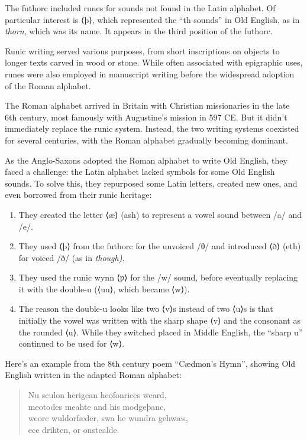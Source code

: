 The futhorc included runes for sounds not found in the Latin alphabet. Of particular interest is ⟨þ⟩, which represented the ``th sounds'' in Old English, as in \textit{thorn}, which was its name. It appears in the third position of the futhorc.

Runic writing served various purposes, from short inscriptions on objects to longer texts carved in wood or stone. While often associated with epigraphic uses, runes were also employed in manuscript writing before the widespread adoption of the Roman alphabet.

The Roman alphabet arrived in Britain with Christian missionaries in the late 6th century, most famously with Augustine's mission in 597 CE. But it didn't immediately replace the runic system. Instead, the two writing systems coexisted for several centuries, with the Roman alphabet gradually becoming dominant.

As the Anglo-Saxons adopted the Roman alphabet to write Old English, they faced a challenge: the Latin alphabet lacked symbols for some Old English sounds. To solve this, they repurposed some Latin letters, created new ones, and even borrowed from their runic heritage:

\begin{enumerate}[noitemsep]
    \item They created the letter ⟨æ⟩ (ash) to represent a vowel sound between /a/ and /e/.

    \item They used ⟨þ⟩ from the futhorc for the unvoiced /θ/ and introduced ⟨ð⟩ (eth) for voiced /ð/ (as in \textit{though)}.

    \item They used the runic wynn ⟨ƿ⟩ for the /w/ sound, before eventually replacing it with the double-u (⟨uu⟩, which became ⟨w⟩).

    \item The reason the double-u looks like two ⟨v⟩s instead of two ⟨u⟩s is that initially the vowel was written with the sharp shape ⟨v⟩ and the consonant as the rounded ⟨u⟩. While they switched placed in Middle English, the ``sharp u'' continued to be used for ⟨w⟩.
\end{enumerate}

Here's an example from the 8th century poem ``Cædmon's Hymn'', showing Old English written in the adapted Roman alphabet:

\begin{quote}
Nu sculon herigean heofonrices weard,\\
meotodes meahte and his modgeþanc,\\
weorc wuldorfæder, swa he wundra gehwæs,\\
ece drihten, or onstealde.
\end{quote}

